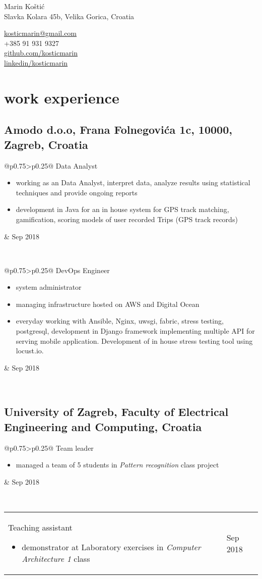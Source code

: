 \documentclass[a4paper]{article}
\makeatletter
\newlength{\tablewidth}
\newenvironment{period}[2]{%
\newcommand{\sarma}{#2}%
\setlength{\tablewidth}{\linewidth}
\addtolength{\tablewidth}{-2\tabcolsep}
\begin{tabular}{@{}p{0.75\tablewidth}>{\raggedleft\arraybackslash}p{0.25\tablewidth}@{}}%
#1 \newline
\begin{itemize}
}{%
\end{itemize} & \sarma \\%
\end{tabular}\\
}
\makeatother
\begin{document}
\fontfamily{\sfdefault}
\selectfont

\begin{minipage}{.5\textwidth}
\LARGE{Marin Koštić}\\
\normalsize{Slavka Kolara 45b, Velika Gorica, Croatia}
\end{minipage}%
\begin{minipage}{.5\textwidth}
\raggedleft
\href{mailto:kosticmarin@gmail.com}{kosticmarin@gmail.com}\\
+385 91 931 9327 \\
\href{https://github.com/kosticmarin}{github.com/kosticmarin}\\
\href{https://www.linkedin.com/in/marin-koštić-495949155}{linkedin/kosticmarin}
\end{minipage}

\vspace{1em}

\section{work experience}
\subsection{Amodo d.o.o, Frana Folnegovića 1c, 10000, Zagreb, Croatia}
\begin{period}{Data Analyst}{Sep 2018}
    \item working as an Data Analyst, interpret data, analyze results using statistical techniques and provide ongoing reports
    \item development in Java for an in house system for GPS track matching, gamification, scoring models of user recorded Trips (GPS track records)
\end{period}
\begin{period}{DevOps Engineer}{Jul 2017 -- Sep 2018}
    \item system administrator
    \item managing infrastructure hosted on AWS and Digital Ocean
    \item everyday working with Ansible, Nginx, uwsgi, fabric, stress testing, postgresql, development in Django framework implementing multiple API for serving
    mobile application. Development of in house stress testing tool using locust.io.
\end{period}
\subsection{University of Zagreb, Faculty of Electrical Engineering and Computing, Croatia}
\begin{period}{Team leader}{Sep 2016 -- Jan 2017}
    \item managed a team of 5 students in \textit{Pattern recognition} class project
\end{period}
\begin{period}{Teaching assistant}{Jan 2015 -- May 2015}
    \item demonstrator at Laboratory exercises in \textit{Computer Architecture 1} class
\end{period}
\end{document}
